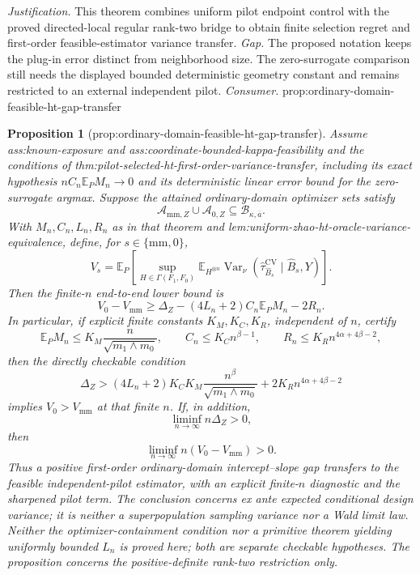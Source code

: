 \documentclass{article}
\newtheorem{proposition}{Proposition}
\begin{document}
\par\smallskip\noindent \textit{Justification.} This theorem combines uniform pilot endpoint control with the proved directed-local regular rank-two bridge to obtain finite selection regret and first-order feasible-estimator variance transfer. \textit{Gap.} The proposed notation keeps the plug-in error distinct from neighborhood size.  The zero-surrogate comparison still needs the displayed bounded deterministic geometry constant and remains restricted to an external independent pilot. \textit{Consumer.} prop:ordinary-domain-feasible-ht-gap-transfer

\begin{proposition}[prop:ordinary-domain-feasible-ht-gap-transfer]\label{prop:ordinary-domain-feasible-ht-gap-transfer}
Assume ass:known-exposure and ass:coordinate-bounded-kappa-feasibility and the conditions of thm:pilot-selected-ht-first-order-variance-transfer, including its exact hypothesis \(nC_n\mathbb E_PM_n\to0\) and its deterministic linear error bound for the zero-surrogate argmax.  Suppose the attained ordinary-domain optimizer sets satisfy
\[
\mathcal A_{\mathrm{mm},Z}\cup\mathcal A_{0,Z}
\subseteq\mathcal B_{\kappa,\overline a}.
\]
With \(M_n,C_n,L_n,R_n\) as in that theorem and lem:uniform-zhao-ht-oracle-variance-equivalence, define, for \(s\in\{\mathrm{mm},0\}\),
\[
V_s=
\mathbb E_P\left[
\sup_{H\in\Gamma(F_1,F_0)}
\mathbb E_{H^{\otimes n}}
\operatorname{Var}_\nu
(\widehat\tau_{\widehat B_s}^{\mathrm{CV}}\mid\widehat B_s,Y)
\right].
\]
Then the finite-\(n\) end-to-end lower bound is
\[
V_0-V_{\mathrm{mm}}
\ge
\Delta_Z-(4L_n+2)C_n\mathbb E_PM_n-2R_n.
\]
In particular, if explicit finite constants \(K_M,K_C,K_R\), independent of \(n\), certify
\[
\mathbb E_PM_n\le K_M\frac{n}{\sqrt{m_1\wedge m_0}},
\qquad
C_n\le K_Cn^{\beta-1},
\qquad
R_n\le K_Rn^{4\alpha+4\beta-2},
\]
then the directly checkable condition
\[
\Delta_Z>
(4L_n+2)K_CK_M
\frac{n^{\beta}}{\sqrt{m_1\wedge m_0}}
+2K_Rn^{4\alpha+4\beta-2}
\]
implies \(V_0>V_{\mathrm{mm}}\) at that finite \(n\).  If, in addition,
\[
\liminf_{n\to\infty}n\Delta_Z>0,
\]
then
\[
\liminf_{n\to\infty}n(V_0-V_{\mathrm{mm}})>0.
\]
Thus a positive first-order ordinary-domain intercept--slope gap transfers to the feasible independent-pilot estimator, with an explicit finite-\(n\) diagnostic and the sharpened pilot term.  The conclusion concerns ex ante expected conditional design variance; it is neither a superpopulation sampling variance nor a Wald limit law.  Neither the optimizer-containment condition nor a primitive theorem yielding uniformly bounded \(L_n\) is proved here; both are separate checkable hypotheses.  The proposition concerns the positive-definite rank-two restriction only.
\end{proposition}
\end{document}
